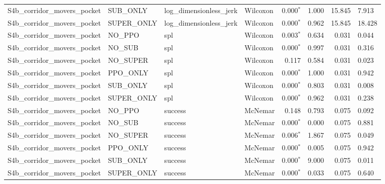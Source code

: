 \begin{tabular}{llllrrrl}
  S4b_corridor_movers_pocket & SUB_ONLY & log_dimensionless_jerk & Wilcoxon & 0.000$^{*}$ & 1.000 & 15.845 & 7.913 \\
  S4b_corridor_movers_pocket & SUPER_ONLY & log_dimensionless_jerk & Wilcoxon & 0.000$^{*}$ & 0.962 & 15.845 & 18.428 \\
  S4b_corridor_movers_pocket & NO_PPO & spl & Wilcoxon & 0.003$^{*}$ & 0.634 & 0.031 & 0.044 \\
  S4b_corridor_movers_pocket & NO_SUB & spl & Wilcoxon & 0.000$^{*}$ & 0.997 & 0.031 & 0.316 \\
  S4b_corridor_movers_pocket & NO_SUPER & spl & Wilcoxon & 0.117 & 0.584 & 0.031 & 0.023 \\
  S4b_corridor_movers_pocket & PPO_ONLY & spl & Wilcoxon & 0.000$^{*}$ & 1.000 & 0.031 & 0.942 \\
  S4b_corridor_movers_pocket & SUB_ONLY & spl & Wilcoxon & 0.000$^{*}$ & 0.803 & 0.031 & 0.008 \\
  S4b_corridor_movers_pocket & SUPER_ONLY & spl & Wilcoxon & 0.000$^{*}$ & 0.962 & 0.031 & 0.238 \\
  S4b_corridor_movers_pocket & NO_PPO & success & McNemar & 0.148 & 0.793 & 0.075 & 0.092 \\
  S4b_corridor_movers_pocket & NO_SUB & success & McNemar & 0.000$^{*}$ & 0.000 & 0.075 & 0.881 \\
  S4b_corridor_movers_pocket & NO_SUPER & success & McNemar & 0.006$^{*}$ & 1.867 & 0.075 & 0.049 \\
  S4b_corridor_movers_pocket & PPO_ONLY & success & McNemar & 0.000$^{*}$ & 0.005 & 0.075 & 0.942 \\
  S4b_corridor_movers_pocket & SUB_ONLY & success & McNemar & 0.000$^{*}$ & 9.000 & 0.075 & 0.011 \\
  S4b_corridor_movers_pocket & SUPER_ONLY & success & McNemar & 0.000$^{*}$ & 0.033 & 0.075 & 0.640 \\
\bottomrule
\end{tabular}